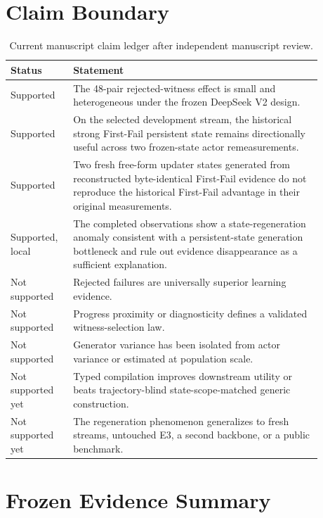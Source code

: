 \section{Claim Boundary}
\label{app:claims}

\begin{table}[h]
\centering
\caption{Current manuscript claim ledger after independent manuscript review.}
\small
\setlength{\tabcolsep}{3pt}
\begin{tabular}{p{0.16\linewidth}p{0.72\linewidth}}
\toprule
Status & Statement \\
\midrule
Supported & The 48-pair rejected-witness effect is small and heterogeneous under the frozen DeepSeek V2 design. \\
Supported & On the selected development stream, the historical strong First-Fail persistent state remains directionally useful across two frozen-state actor remeasurements. \\
Supported & Two fresh free-form updater states generated from reconstructed byte-identical First-Fail evidence do not reproduce the historical First-Fail advantage in their original measurements. \\
Supported, local & The completed observations show a state-regeneration anomaly consistent with a persistent-state generation bottleneck and rule out evidence disappearance as a sufficient explanation. \\
Not supported & Rejected failures are universally superior learning evidence. \\
Not supported & Progress proximity or diagnosticity defines a validated witness-selection law. \\
Not supported & Generator variance has been isolated from actor variance or estimated at population scale. \\
Not supported yet & Typed compilation improves downstream utility or beats trajectory-blind state-scope-matched generic construction. \\
Not supported yet & The regeneration phenomenon generalizes to fresh streams, untouched E3, a second backbone, or a public benchmark. \\
\bottomrule
\end{tabular}
\end{table}

\section{Frozen Evidence Summary}
\label{app:evidence}

